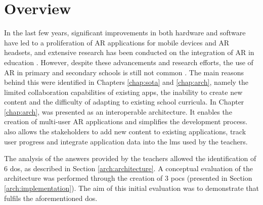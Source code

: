 \section{Overview}\label{eval:introduction}

In the last few years, significant improvements in both hardware and software have led to a proliferation of AR applications for mobile devices and AR headsets, and extensive research has been conducted on the integration of AR in education \citep{7943075, akccayir2017advantages, chen2017new, ibanez2018augmented, pellas2019augmenting, 10.3897/jucs.76535}. However, despite these advancements and research efforts, the use of AR in primary and secondary schools is still not common \citep{doi/10.2759/121671}.
The main reasons behind this were identified in Chapters \ref{chap:sota} and \ref{chap:arch}, namely the limited collaboration capabilities of existing apps, the inability to create new content and the difficulty of adapting to existing school curricula.
In Chapter \ref{chap:arch}, \arch{} was presented as an interoperable architecture. It enables the creation of multi-user AR applications and simplifies the development process. \arch{} also allows the stakeholders to add new content to existing applications, track user progress and integrate application data into the \gls{lms} used by the teachers.

The analysis of the answers provided by the teachers allowed the identification of 6 \glspl{do}, as described in Section \ref{arch:architecture}. A conceptual evaluation of the \arch{} architecture was performed through the creation of 3 \glspl{poc} (presented in Section \ref{arch:implementation}). The aim of this initial evaluation was to demonstrate that \arch{} fulfils the aforementioned \glspl{do}.

 

